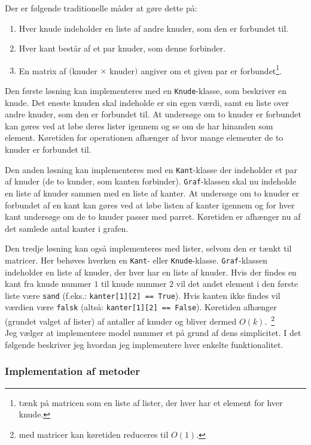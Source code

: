 \documentclass[10pt,a4paper,danish]{article}
\newcommand{\ct}{\texttt}
\begin{document}
Der er følgende traditionelle måder at gøre dette på:
\begin{enumerate}
\item Hver knude indeholder en liste af andre knuder, som den er
  forbundet til.
\item Hver kant består af et par knuder, som denne forbinder.
\item En matrix af $($knuder $\times$ knuder$)$ angiver om et given
  par er forbundet\footnote{tænk på matricen som en liste af
    lister, der hver har et element for hver knude.}.
\end{enumerate}

Den første løsning kan implementeres med en \ct{Knude}-klasse, som
beskriver en knude. Det eneste knuden skal indeholde er sin egen
værdi, samt en liste over andre knuder, som den er forbundet til. At
undersøge om to knuder er forbundet kan gøres ved at løbe deres lister
igennem og se om de har hinanden som element. Køretiden for
operationen afhænger af hvor mange elementer de to knuder er forbundet
til.

Den anden løsning kan implementeres med en \ct{Kant}-klasse der
indeholder et par af knuder (de to kunder, som kanten
forbinder). \ct{Graf}-klassen skal nu indeholde en liste af knuder
sammen med en liste af kanter. At undersøge om to knuder er forbundet
af en kant kan gøres ved at løbe listen af kanter igennem og for hver
kant undersøge om de to knuder passer med parret. Køretiden er
afhænger nu af det samlede antal kanter i grafen.

Den tredje løsning kan også implementeres med lister, selvom den er
tænkt til matricer. Her behøves hverken en \ct{Kant}- eller
\ct{Knude}-klasse. \ct{Graf}-klassen indeholder en liste af knuder,
der hver har en liste af knuder. Hvis der findes en kant fra knude
nummer $1$ til knude nummer $2$ vil det andet element i den første
liste være \ct{sand} (f.eks.: \ct{kanter[1][2] == True}). Hvis kanten
ikke findes vil værdien være \ct{falsk} (altså: \ct{kanter[1][2] ==
  False}). Køretiden afhænger (grundet valget af lister) af antaller
af knuder og bliver dermed $O(k)$.\ \footnote{med matricer kan
  køretiden reduceres til $O(1)$.}\\

Jeg vælger at implementere model nummer et på grund af dens
simplicitet. I det følgende beskriver jeg hvordan jeg implementere
hver enkelte funktionalitet.

\subsubsection{Implementation af metoder}
\end{document}
